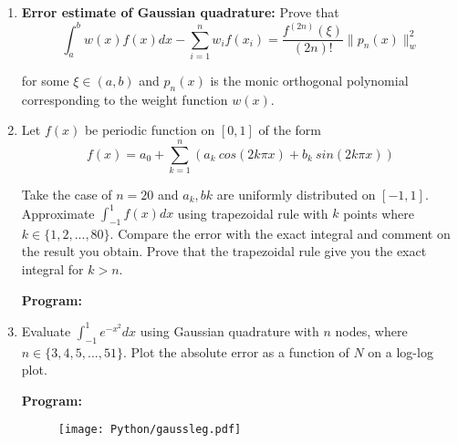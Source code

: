 \documentclass{article}
\begin{document}
\begin{enumerate}
\item \textbf{Error estimate of Gaussian quadrature:} Prove that
\begin{equation*}
\int_{a}^{b} w(x) f(x) dx - \sum_{i=1}^{n} w_{i} f(x_{i}) = \frac{f^{(2n)} (\xi)}{(2n)!} \lVert p_{n} (x) \rVert_{w}^{2}
\end{equation*}

for some $\xi \in (a,b)$ and $p_{n}(x)$ is the monic orthogonal polynomial corresponding to the weight function $w(x)$.

\item Let $f(x)$ be periodic function on $[0,1]$ of the form 
\begin{equation*}
f(x) = a_{0} + \sum_{k=1}^{n} (a_{k}\ cos(2k\pi x) + b_{k}\ sin(2k\pi x))
\end{equation*}

Take the case of $n = 20$ and $a_{k}, b{k}$ are uniformly distributed on $[-1,1]$.
Approximate $\displaystyle \int_{-1}^{1} f(x) dx$ using trapezoidal rule with $k$ points where $k \in
\{1,2,...,80\}$. Compare the error with the exact integral and comment on the result you
obtain. Prove that the trapezoidal rule give you the exact integral for $k > n$.

\textbf{Program:}


\item Evaluate $\displaystyle \int_{-1}^{1} e^{-x^{2}} dx$ using Gaussian quadrature with $n$ nodes,
where $n \in \{3,4,5,...,51\}$. Plot the absolute error as a function of $N$ on a log-log
plot.

\textbf{Program:}


\begin{figure}[ht!]
\texttt{[image: Python/gaussleg.pdf]}
\centering
\end{figure}

\end{enumerate}
\end{document}
